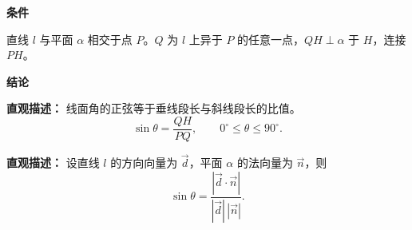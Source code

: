 \begin{statementbox}
	\textbf{\textcolor{CStatement}{条件}}
	\begin{description}[style=nextline, leftmargin=2.8em, labelsep=0.5em, itemsep=0.35em]
		\item[\textbf{\textcolor{CStatement}{条件1（线面相交）：}}] 直线 $l$ 与平面 $\alpha$ 相交于点 $P$。$Q$ 为 $l$ 上异于 $P$ 的任意一点，$QH\perp\alpha$ 于 $H$，连接 $PH$。
	\end{description}

	\textbf{\textcolor{CStatement}{结论}}
	\begin{description}[style=nextline, leftmargin=2.8em, labelsep=0.5em, itemsep=0.45em]
		\item[\textbf{\textcolor{CStatement}{结论一（正弦公式）：}}]
			\textbf{\textcolor{CStatement}{直观描述：}}
			线面角的正弦等于垂线段长与斜线段长的比值。
			\[
				\sin\theta = \frac{QH}{PQ},
				\qquad
				0^\circ \le \theta \le 90^\circ .
			\]

		\item[\textbf{\textcolor{CStatement}{常见变形（向量公式）：}}]
			\textbf{\textcolor{CStatement}{直观描述：}}
			设直线 $l$ 的方向向量为 $\vec{d}$，平面 $\alpha$ 的法向量为 $\vec{n}$，则
			\[
				\sin\theta = \frac{|\vec{d} \cdot \vec{n}|}{|\vec{d}|\,|\vec{n}|}.
			\]
	\end{description}
\end{statementbox}
